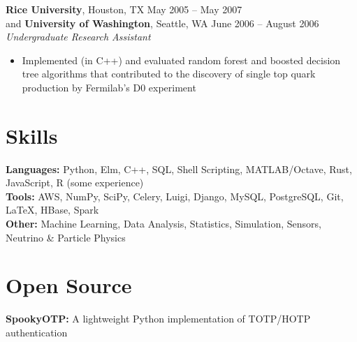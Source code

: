 \documentclass[margin,line]{resume}
\begin{document}
\begin{resume}
    \textbf{Rice University}, Houston, TX \hfill May 2005 -- May 2007 \vspace{1mm}\\\vspace{1mm}%
    and \textbf{University of Washington}, Seattle, WA \hfill June 2006 -- August 2006 \vspace{1mm}\\\vspace{1mm}%
    \textsl{Undergraduate Research Assistant}
    \begin{itemize}
    \item Implemented (in C++) and evaluated random forest and boosted decision tree algorithms that contributed to the discovery of single top quark production by Fermilab's D0 experiment
    \end{itemize}

    \section{\mysidestyle Skills}\vspace{0mm}%
    \textbf{Languages:} Python, Elm, C++, SQL, Shell Scripting, MATLAB/Octave, Rust, JavaScript, R (some experience)
    \vspace{1mm}\\\vspace{0mm}%
    \textbf{Tools:} AWS, NumPy, SciPy, Celery, Luigi, Django, MySQL, PostgreSQL, Git, \LaTeX, HBase, Spark
    \vspace{1mm}\\\vspace{0mm}%
    \textbf{Other:} Machine Learning, Data Analysis, Statistics, Simulation, Sensors, Neutrino \& Particle Physics

    \section{\mysidestyle Open Source}\vspace{0mm}%
    \textbf{SpookyOTP:} A lightweight Python implementation of TOTP/HOTP authentication
    \vspace{1mm}%


\end{resume}
\end{document}
